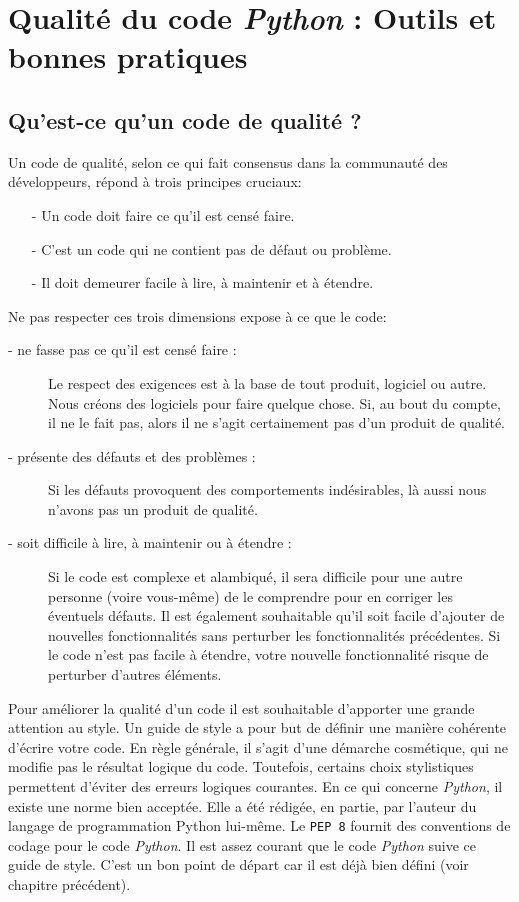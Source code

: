 \documentclass[a4paper,12pt]{book}
\begin{document}
\chapter{Qualité du code \textit{Python} : Outils et bonnes pratiques}
\section{Qu’est-ce qu’un code de qualité ?}
Un code de qualité, selon ce qui fait consensus dans la communauté des développeurs, répond à trois principes cruciaux:
\begin{itemize}
	\item[-] Un code doit faire ce qu’il est censé faire.
	\item[-] C'est un code qui ne contient pas de défaut ou problème.
	\item[-] Il doit demeurer facile à lire, à maintenir et à étendre.
\end{itemize}
\medskip

Ne pas respecter ces trois dimensions expose à ce que le code:
\begin{description}
	\item[- ne fasse pas ce qu'il est censé faire :] Le respect des exigences est à la base de tout produit, logiciel ou autre. Nous créons des logiciels pour faire quelque chose. Si, au bout du compte, il ne le fait pas, alors il ne s'agit certainement pas d'un produit de qualité.
	\item[- présente des défauts et des problèmes :] Si les défauts provoquent des comportements indésirables, là aussi nous n'avons pas un produit de qualité.
	\item[- soit difficile à lire, à maintenir ou à étendre :] Si le code est complexe et alambiqué, il sera difficile pour une autre personne (voire vous-même) de le comprendre pour en corriger les éventuels défauts.
Il est également souhaitable qu'il soit facile d'ajouter de nouvelles fonctionnalités sans perturber les fonctionnalités précédentes. Si le code n'est pas facile à étendre, votre nouvelle fonctionnalité risque de perturber d'autres éléments.
\end{description}
\medskip

Pour améliorer la qualité d'un code il est souhaitable d'apporter une grande attention au style. Un guide de style a pour but de définir une manière cohérente d'écrire votre code. En règle générale, il s'agit d'une démarche cosmétique, qui ne modifie pas le résultat logique du code. Toutefois, certains choix stylistiques permettent d'éviter des erreurs logiques courantes.
En ce qui concerne \textit{Python}, il existe une norme bien acceptée. Elle a été rédigée, en partie, par l'auteur du langage de programmation Python lui-même. Le \texttt{PEP 8} fournit des conventions de codage pour le code \textit{Python}. Il est assez courant que le code \textit{Python} suive ce guide de style. C'est un bon point de départ car il est déjà bien défini (voir chapitre précédent).
\medskip
\end{document}
